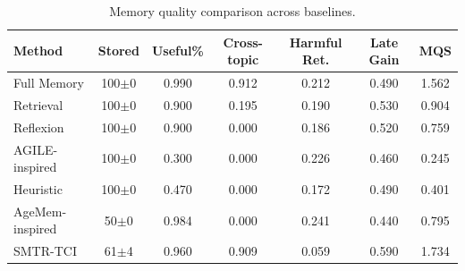 \begin{table}[t]
\caption{Memory quality comparison across baselines.}
\label{tab:memory_quality}
\centering
\begin{tabular}{l c c c c c c}
\toprule
Method & Stored & Useful\% & Cross-topic & Harmful Ret. & Late Gain & MQS \\
\midrule
Full Memory & 100$\pm$0 & 0.990 & 0.912 & 0.212 & 0.490 & 1.562 \\
Retrieval & 100$\pm$0 & 0.900 & 0.195 & 0.190 & 0.530 & 0.904 \\
Reflexion & 100$\pm$0 & 0.900 & 0.000 & 0.186 & 0.520 & 0.759 \\
AGILE-inspired & 100$\pm$0 & 0.300 & 0.000 & 0.226 & 0.460 & 0.245 \\
Heuristic & 100$\pm$0 & 0.470 & 0.000 & 0.172 & 0.490 & 0.401 \\
AgeMem-inspired & 50$\pm$0 & 0.984 & 0.000 & 0.241 & 0.440 & 0.795 \\
SMTR-TCI & 61$\pm$4 & 0.960 & 0.909 & 0.059 & 0.590 & 1.734 \\
\bottomrule
\end{tabular}
\end{table}

